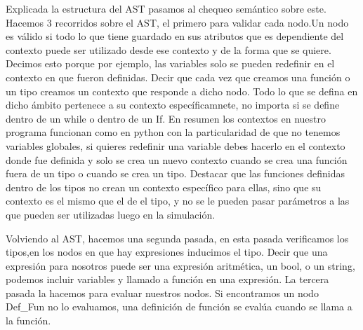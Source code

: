 \documentclass[12pt, letterpaper,spanish]{article}
\theoremstyle{definition}
\theoremstyle{remark}
\begin{document}
        Explicada la estructura del AST pasamos al chequeo semántico sobre este. Hacemos 3 recorridos sobre el AST, el primero para validar cada nodo.Un nodo es válido si todo lo que tiene guardado en sus atributos que es dependiente del contexto puede ser utilizado desde ese contexto y de la forma que se quiere. Decimos esto porque por ejemplo, las variables solo se pueden redefinir en el contexto en que fueron definidas. Decir que cada vez que creamos una función o un tipo creamos un contexto que responde a dicho nodo. Todo lo que se defina en dicho ámbito pertenece a su contexto específicamnete, no importa si se define dentro de un
        while o dentro de un If. En resumen los contextos en nuestro programa funcionan como en python con la particularidad de que no tenemos variables globales, si quieres redefinir una variable debes hacerlo en el contexto donde fue definida y solo se crea un nuevo contexto cuando se crea una función fuera de un tipo o cuando se crea un tipo. Destacar que las funciones definidas dentro de los tipos no crean un contexto específico para ellas, sino que su contexto es el mismo que el de el tipo, y no se le pueden pasar parámetros a las que pueden ser utilizadas luego en la simulación.

        Volviendo al AST, hacemos una segunda pasada, en esta pasada verificamos los tipos,en los nodos en que hay expresiones inducimos el tipo. Decir que una expresión para nosotros puede ser una expresión aritmética, un bool, o un string, podemos incluir variables y llamado a función en una expresión. La tercera pasada la hacemos para evaluar nuestros nodos. Si encontramos un nodo Def\_Fun no lo evaluamos, una definición de función se evalúa cuando se llama a la función.
\end{document}
